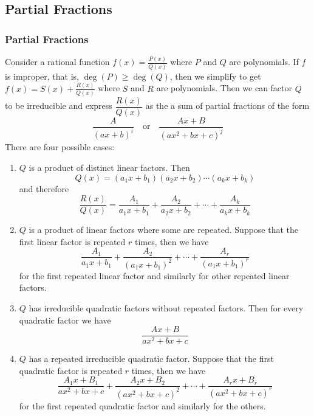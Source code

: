 \subsection{Partial Fractions}
\subsubsection{Partial Fractions}
Consider a rational function \(\displaystyle{f(x)=\frac{P(x)}{Q(x)}}\) where
\(P\) and \(Q\) are polynomials.
If \(f\) is improper, that is, \(\deg(P)\geq\deg(Q)\), then we simplify to get
\(\displaystyle{f(x)=S(x)+\frac{R(x)}{Q(x)}}\) where \(S\) and \(R\) are
polynomials.
Then we can factor \(Q\) to be irreducible and express \(\dfrac{R(x)}{Q(x)}\)
as the a sum of partial fractions of the form
\[\frac{A}{(ax+b)^i}\quad\text{or}\quad\frac{Ax+B}{(ax^2+bx+c)^j}\]
There are four possible cases:
\begin{enumerate}
    \item \(Q\) is a product of distinct linear factors.
    Then
    \[Q(x)=(a_1 x+b_1)(a_2 x+b_2)\cdots(a_k x+b_k)\]
    and therefore
    \[\frac{R(x)}{Q(x)}=\frac{A_1}{a_1 x+b_1}+\frac{A_2}{a_2 x+b_2}+\cdots+
    \frac{A_k}{a_k x+b_k}\]
    \item \(Q\) is a product of linear factors where some are repeated.
    Suppose that the first linear factor is repeated \(r\) times, then we have
    \[\frac{A_1}{a_1 x+b_1}+\frac{A_2}{(a_1 x+b_1)^2}+\cdots+
    \frac{A_r}{(a_1 x+b_1)^r}\]
    for the first repeated linear factor and similarly for other repeated
    linear factors.
    \item \(Q\) has irreducible quadratic factors without repeated
    factors.
    Then for every quadratic factor we have
    \[\frac{Ax+B}{ax^2+bx+c}\]
    \item \(Q\) has a repeated irreducible quadratic factor.
    Suppose that the first quadratic factor is repeated \(r\) times,
    then we have
    \[\frac{A_1 x+B_1}{ax^2+bx+c}+\frac{A_2 x+B_2}{(ax^2+bx+c)^2}+\cdots
    +\frac{A_r x+B_r}{(ax^2+bx+c)^r}\]
    for the first repeated quadratic factor and similarly for the others.
\end{enumerate}